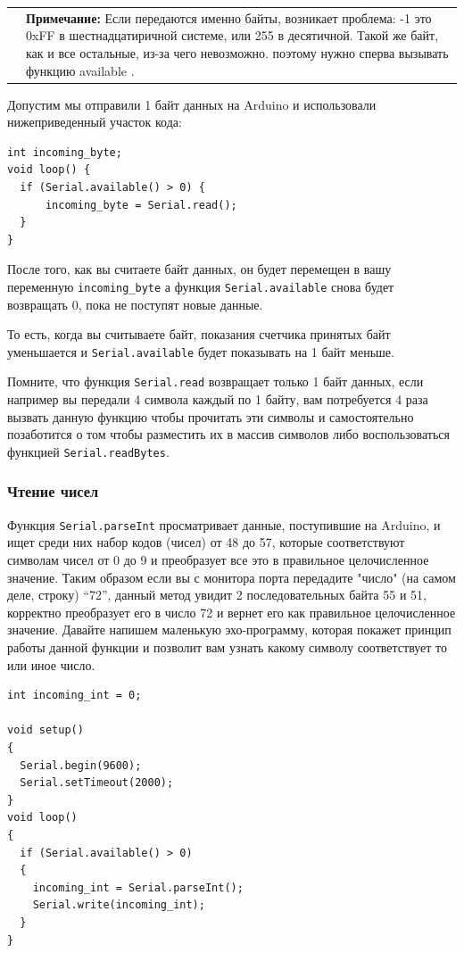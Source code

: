 \documentclass[a4paper,twoside]{book}
\newcommand{\note}[1]{
  \vspace{8pt}
  \begin{tabularx}{\textwidth}{m{1cm} m{9cm}}
    
    & \textbf{Примечание:} #1 \\
  \end{tabularx}
}
\begin{document}
\note{ Если передаются именно байты, возникает проблема: -1 это 0xFF в
  шестнадцатиричной системе, или 255 в десятичной. Такой же байт, как и все
  остальные, из-за чего невозможно. поэтому нужно сперва вызывать функцию available . }

Допустим мы отправили 1 байт данных на Arduino и использовали нижеприведенный
участок кода:

\begin{verbatim}
int incoming_byte;
void loop() {
  if (Serial.available() > 0) {
      incoming_byte = Serial.read();
  }
}
\end{verbatim}

После того, как вы считаете байт данных, он будет перемещен в вашу переменную
\texttt{incoming\_byte} а функция \texttt{Serial.available} снова будет
возвращать 0, пока не поступят новые данные.

То есть, когда вы считываете байт, показания счетчика принятых байт уменьшается
и \texttt{Serial.available} будет показывать на 1 байт меньше.

Помните, что функция \texttt{Serial.read} возвращает только 1 байт данных, если
например вы передали 4 символа каждый по 1 байту, вам потребуется 4 раза вызвать
данную функцию чтобы прочитать эти символы и самостоятельно позаботится о том
чтобы разместить их в массив символов либо воспользоваться функцией
\texttt{Serial.readBytes}.

\subsubsection{Чтение чисел}

Функция \texttt{Serial.parseInt} просматривает данные, поступившие на Arduino, и
ищет среди них набор кодов (чисел) от 48 до 57, которые соответствуют символам
чисел от 0 до 9 и преобразует все это в правильное целочисленное значение. Таким
образом если вы с монитора порта передадите "число" (на самом деле, строку)
``72'', данный метод увидит 2 последовательных байта 55 и 51, корректно
преобразует его в число 72 и вернет его как правильное целочисленное значение.
Давайте напишем маленькую эхо-программу, которая покажет принцип работы данной
функции и позволит вам узнать какому символу соответствует то или иное число.

\begin{verbatim}
int incoming_int = 0;

void setup()
{
  Serial.begin(9600);
  Serial.setTimeout(2000);
}
void loop()
{
  if (Serial.available() > 0)
  {
    incoming_int = Serial.parseInt();
    Serial.write(incoming_int);
  }
}
\end{verbatim}
\end{document}
